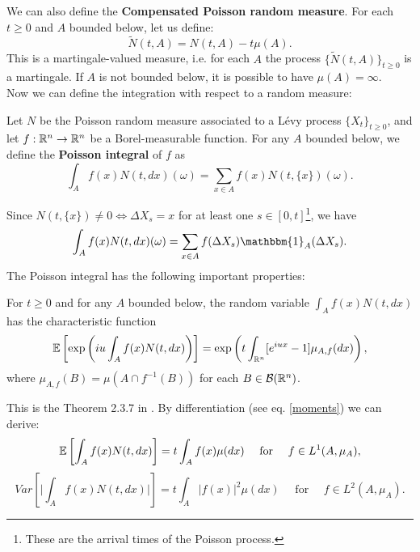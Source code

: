 We can also define the \textbf{Compensated Poisson random measure}. For each $t \geq 0$ and $A$ bounded below, let us define: 
\begin{equation}
 \tilde{N}(t,A) = N(t,A) - t\mu(A). 
\end{equation}
This is a martingale-valued measure, i.e. for each $A$ the process $\bigl \{ \tilde{N}(t,A) \bigr \}_{t\geq 0} $ is a martingale.  
If $A$ is not bounded below, it is possible to have $\mu(A) = \infty$. \\

\noindent
Now we can define the integration with respect to a random measure:
\begin{Definition} \label{Poisson_int}
 Let $N$ be the Poisson random measure associated to a Lévy process $\{X_t\}_{t \geq 0}$, and let $f:\mathbb{R}^n \to \mathbb{R}^n$ be a Borel-measurable
 function. For any $A$ bounded below, we define the \textbf{Poisson integral} of $f$ as
 \begin{equation}
  \int_A f(x) N(t,dx)(\omega) = \sum_{x\in A} f(x) N(t,\{x\})(\omega). 
 \end{equation}
\end{Definition}
Since $N(t,\{x\}) \neq 0 \Leftrightarrow \Delta X_s=x$ for at least one $s\in [0,t]$\footnote{These are the arrival 
times of the Poisson process.}, we have  
 \begin{equation}
  \int_A f(x) N(t,dx)(\omega) = \sum_{x\in A} f(\Delta X_s) \mathbbm{1}_A(\Delta X_s). 
 \end{equation}
The Poisson integral has the following important properties: 
\begin{Theorem}
 For $t\geq 0$ and for any $A$ bounded below, the random variable $\int_A f(x) N(t,dx)$ has the characteristic function
 \begin{equation}
  \mathbb{E} \left[ \exp \left( i u \int_A f(x) N(t,dx) \right) \right] = 
  \exp \left( t \int_{\mathbb{R}^n} [e^{iux}-1] \mu_{A,f}(dx) \right),
 \end{equation}
where $\mu_{A,f}(B) = \mu(A \cap f^{-1}(B))$ for each $B \in \mathcal{B}(\mathbb{R}^n)$.
\end{Theorem}
This is the Theorem 2.3.7 in \cite{Applebaum}. By differentiation (see eq. \ref{moments}) we can derive:
\begin{equation}\label{Exp_poiss}
 \mathbb{E} \left[ \int_A f(x) N(t,dx) \right] = t \int_A f(x) \mu(dx) \quad \mbox{ for } \quad f \in L^1(A,\mu_A),
\end{equation}
\begin{equation}
 Var \left[ \biggr|\int_A f(x) N(t,dx)\biggr|\right] = t \int_A |f(x)|^2 \mu(dx) \quad \mbox{ for } \quad f \in L^2(A,\mu_A).
\end{equation}

